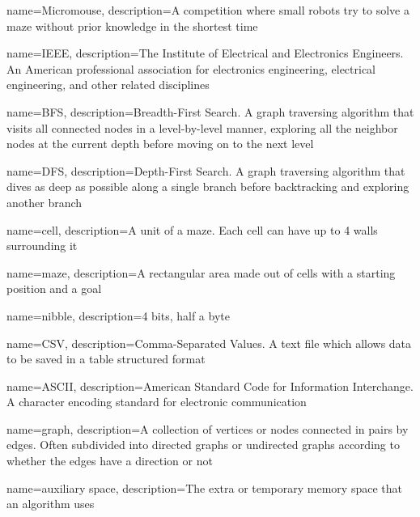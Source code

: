 {
    name=Micromouse,
    description={A competition where small robots try to solve a maze without prior knowledge in the shortest time}
}

{
    name=IEEE,
    description={The Institute of Electrical and Electronics Engineers. An American professional association for electronics engineering, electrical engineering, and other related disciplines}
}

{
    name=BFS,
    description={Breadth-First Search. A graph traversing algorithm that visits all connected nodes in a level-by-level manner, exploring all the neighbor nodes at the current depth before moving on to the next level}
}

{
    name=DFS,
    description={Depth-First Search. A graph traversing algorithm that dives as deep as possible along a single branch before backtracking and exploring another branch}
}

{
    name=cell,
    description={A unit of a maze. Each cell can have up to 4 walls surrounding it}
}

{
    name=maze,
    description={A rectangular area made out of cells with a starting position and a goal}
}

{
    name=nibble,
    description={4 bits, half a byte}
}

{
    name=CSV,
    description={Comma-Separated Values. A text file which allows data to be saved in a table structured format}
}

{
    name=ASCII,
    description={American Standard Code for Information Interchange. A character encoding standard for electronic communication}
}

{
    name=graph,
    description={A collection of vertices or nodes connected in pairs by edges. Often subdivided into directed graphs or undirected graphs according to whether the edges have a direction or not}
}

{
    name=auxiliary space,
    description={The extra or temporary memory space that an algorithm uses}
}